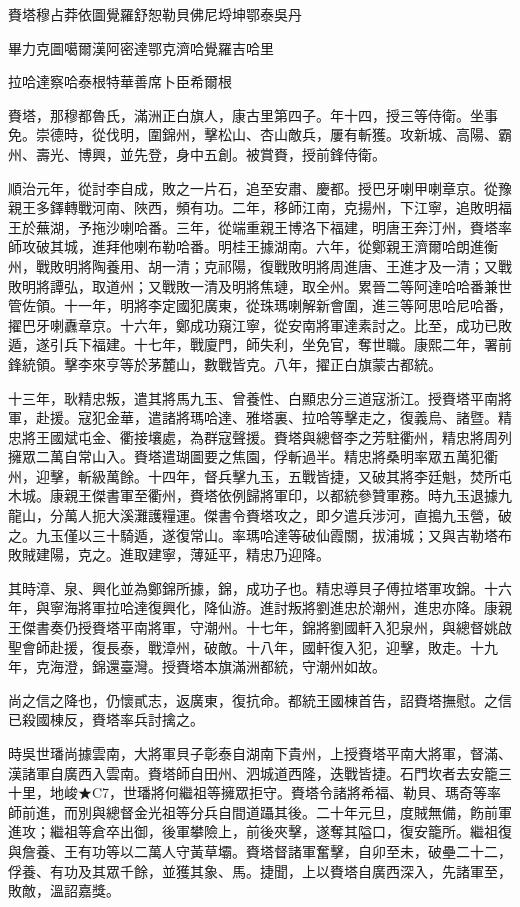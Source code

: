 
\begin{pinyinscope}
賚塔穆占莽依圖覺羅舒恕勒貝佛尼埒坤鄂泰吳丹

畢力克圖噶爾漢阿密達鄂克濟哈覺羅吉哈里

拉哈達察哈泰根特華善席卜臣希爾根

賚塔，那穆都魯氏，滿洲正白旗人，康古里第四子。年十四，授三等侍衛。坐事免。崇德時，從伐明，圍錦州，擊松山、杏山敵兵，屢有斬獲。攻新城、高陽、霸州、壽光、博興，並先登，身中五創。被賞賚，授前鋒侍衛。

順治元年，從討李自成，敗之一片石，追至安肅、慶都。授巴牙喇甲喇章京。從豫親王多鐸轉戰河南、陜西，頻有功。二年，移師江南，克揚州，下江寧，追敗明福王於蕪湖，予拖沙喇哈番。三年，從端重親王博洛下福建，明唐王奔汀州，賚塔率師攻破其城，進拜他喇布勒哈番。明桂王據湖南。六年，從鄭親王濟爾哈朗進衡州，戰敗明將陶養用、胡一清；克祁陽，復戰敗明將周進唐、王進才及一清；又戰敗明將譚弘，取道州；又戰敗一清及明將焦璉，取全州。累晉二等阿達哈哈番兼世管佐領。十一年，明將李定國犯廣東，從珠瑪喇解新會圍，進三等阿思哈尼哈番，擢巴牙喇纛章京。十六年，鄭成功窺江寧，從安南將軍達素討之。比至，成功已敗遁，遂引兵下福建。十七年，戰廈門，師失利，坐免官，奪世職。康熙二年，署前鋒統領。擊李來亨等於茅麓山，數戰皆克。八年，擢正白旗蒙古都統。

十三年，耿精忠叛，遣其將馬九玉、曾養性、白顯忠分三道寇浙江。授賚塔平南將軍，赴援。寇犯金華，遣諸將瑪哈達、雅塔裏、拉哈等擊走之，復義烏、諸暨。精忠將王國斌屯金、衢接壤處，為群寇聲援。賚塔與總督李之芳駐衢州，精忠將周列擁眾二萬自常山入。賚塔遣瑚圖要之焦園，俘斬過半。精忠將桑明率眾五萬犯衢州，迎擊，斬級萬餘。十四年，督兵擊九玉，五戰皆捷，又破其將李廷魁，焚所屯木城。康親王傑書軍至衢州，賚塔依例歸將軍印，以都統參贊軍務。時九玉退據九龍山，分萬人扼大溪灘護糧運。傑書令賚塔攻之，即夕遣兵涉河，直搗九玉營，破之。九玉僅以三十騎遁，遂復常山。率瑪哈達等破仙霞關，拔浦城；又與吉勒塔布敗賊建陽，克之。進取建寧，薄延平，精忠乃迎降。

其時漳、泉、興化並為鄭錦所據，錦，成功子也。精忠導貝子傅拉塔軍攻錦。十六年，與寧海將軍拉哈達復興化，降仙游。進討叛將劉進忠於潮州，進忠亦降。康親王傑書奏仍授賚塔平南將軍，守潮州。十七年，錦將劉國軒入犯泉州，與總督姚啟聖會師赴援，復長泰，戰漳州，破敵。十八年，國軒復入犯，迎擊，敗走。十九年，克海澄，錦還臺灣。授賚塔本旗滿洲都統，守潮州如故。

尚之信之降也，仍懷貳志，返廣東，復抗命。都統王國棟首告，詔賚塔撫慰。之信已殺國棟反，賚塔率兵討擒之。

時吳世璠尚據雲南，大將軍貝子彰泰自湖南下貴州，上授賚塔平南大將軍，督滿、漢諸軍自廣西入雲南。賚塔師自田州、泗城道西隆，迭戰皆捷。石門坎者去安籠三十里，地峻★C7，世璠將何繼祖等擁眾拒守。賚塔令諸將希福、勒貝、瑪奇等率師前進，而別與總督金光祖等分兵自間道躡其後。二十年元旦，度賊無備，飭前軍進攻；繼祖等倉卒出御，後軍攀險上，前後夾擊，遂奪其隘口，復安籠所。繼祖復與詹養、王有功等以二萬人守黃草壩。賚塔督諸軍奮擊，自卯至未，破壘二十二，俘養、有功及其眾千餘，並獲其象、馬。捷聞，上以賚塔自廣西深入，先諸軍至，敗敵，溫詔嘉獎。


\end{pinyinscope}
